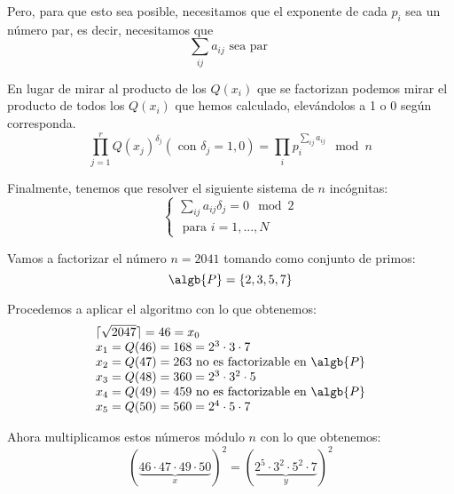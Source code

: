 \begin{mdframed}
Pero, para que esto sea posible, necesitamos que el exponente de cada $p_i$ sea un número par, es decir, necesitamos que
\[\sum_{ij}a_{ij} \text{ sea par }\]

En lugar de mirar al producto de los $Q(x_i)$ que se factorizan podemos mirar el producto de todos los $Q(x_i)$ que hemos calculado, elevándolos a 1 o 0 según corresponda.
\[\prod_{j=1}^r Q(x_j)^{δ_j} (\text{ con } δ_j = 1,0)  = \prod_ip_i^{\sum_{ij}a_{ij}} \mod n\]

Finalmente, tenemos que resolver el siguiente sistema de $n$ incógnitas:
\[\left\{ \begin{array}{l}
\sum_{ij}a_{ij}δ_j = 0 \mod 2 \\
\text{ para } i=1,...,N
\end{array}\right.\]
\end{mdframed}

\begin{example}
Vamos a factorizar el número $n=2041$ tomando como conjunto de primos:
\[\algb{P} = \{ 2,3,5,7\}\]

Procedemos a aplicar el algoritmo con lo que obtenemos:
\[\begin{array}{l}
\lceil\sqrt{2047}\rceil = 46=x_0 \\
x_1 = Q(46)=168=2^3\cdot 3 \cdot 7 \\
x_2 = Q(47) = 263 \text{ no es factorizable en }\algb{P}\\
x_3 = Q(48) = 360 = 2^3\cdot 3^2 \cdot 5 \\
x_4 = Q(49) = 459 \text{ no es factorizable en }\algb{P}\\
x_5 = Q(50) = 560 = 2^4\cdot 5 \cdot 7
\end{array}\]

Ahora multiplicamos estos números módulo $n$ con lo que obtenemos:
\[(\underbrace{46\cdot 47 \cdot 49 \cdot 50}_{x})^2 = (\underbrace{2^5\cdot 3^2 \cdot 5^2 \cdot 7}_y)^2\]
\end{example}
